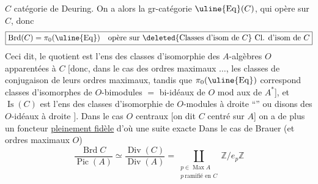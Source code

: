 
$C$ catégorie de Deuring. On a alors la gr-catégorie
$\uline{\operatorname{Eq}}(C)$, qui opère sur $C$, donc
\[
\boxed{\operatorname{Brd}(C)=\pi_0(\uline{\operatorname{Eq}})
\quad\text{opère sur }\deleted{\text{Classes d'isom de }C}
\ \text{Cl. d'isom de }C}
\]
Ceci dit, le quotient est l'ens des classes d'isomorphie des $A$-algèbres $O$ apparentées à $C$
$[$donc, dans le cas des  ordres maximaux $\ldots$,
les classes de conjugaison de leurs ordres maximaux,
tandis que $\pi_0(\uline{\operatorname{Eq}})$ correspond 
 classes d'isomorphes de $O$-bimodules
$=$ bi-idéaux de $O$ mod aux  de  $A^*$],
 et $\operatorname{Is}(C)$ est l'ens des classes d'isomorphie de $O$-modules à droite ``''  ou disons des $O$-idéaux \unsure{$*$} à droite $]$.
Dans le cas  $O$ centraux
$[$on dit $C$ centré sur $A$] on a de plus un foncteur \uline{pleinement fidèle}
d'où une suite exacte
Dans le cas de Brauer (et ordres maximaux $O$)
\[
\frac{\operatorname{Brd}C}{\operatorname{Pic}(A)}
\simeq\frac{\operatorname{Div}(C)}{\operatorname{Div}(A)}
=\coprod_{\substack{p\in\operatorname{Max}A\\p\ \text{ramifié en }C}}
\mathbb Z/e_p\mathbb Z
\]
